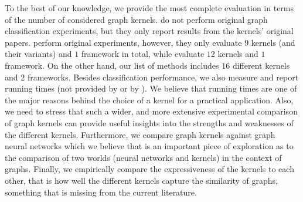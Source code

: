 \documentclass[twoside,11pt]{article}
\begin{document}
To the best of our knowledge, we provide the most complete evaluation in terms of the number of considered graph kernels.
 do not perform original graph classification experiments, but they only report results from the kernels' original papers.
 perform original experiments, however, they only evaluate $9$ kernels (and their variants) and $1$ framework in total, while  evaluate $12$ kernels and $1$ framework.
On the other hand, our list of methods includes $16$ different kernels and $2$ frameworks.
Besides classification performance, we also measure and report running times (not provided by  or by ).
We believe that running times are one of the major reasons behind the choice of a kernel for a practical application.
Also, we need to stress that such a wider, and more extensive experimental comparison of graph kernels can provide useful insights into the strengths and weaknesses of the different kernels.
Furthermore, we compare graph kernels against graph neural networks which we believe that is an important piece of exploration as to the comparison of two worlds (neural networks and kernels) in the context of graphs.
Finally, we empirically compare the expressiveness of the kernels to each other, that is how well the different kernels capture the similarity of graphs, something that is missing from the current literature.
\end{document}
